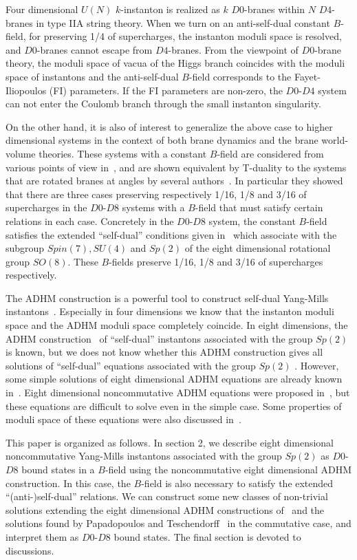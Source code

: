 \documentclass[a4paper,12pt]{article}
\begin{document}
Four dimensional $U(N)$ $k$-instanton is realized as $k$ $D0$-branes 
within $N$ $D4$-branes in type IIA string theory.
When we turn on an anti-self-dual constant $B$-field, 
for preserving 1/4 of supercharges,  
the instanton moduli space is resolved, and $D0$-branes 
cannot escape from $D4$-branes.
From the viewpoint of $D0$-brane theory, 
the moduli space of vacua of the Higgs branch coincides with the moduli space 
of instantons and the anti-self-dual $B$-field corresponds to  
the Fayet-Iliopoulos (FI) parameters.
If the FI parameters are non-zero, the $D0$-$D4$ system can not enter the 
Coulomb branch through the small instanton singularity.

On the other hand, it is also of interest to generalize the above case 
to higher dimensional systems in the context of both brane dynamics and the 
brane world-volume theories.
These systems with a constant $B$-field are considered 
from various points of view in~\cite{cimm, park, witten, fio, ohta}, 
and are shown equivalent by T-duality to the systems 
that are rotated branes at angles by several 
authors~\cite{ohtan, ohta, pt, pt2, ggpt}.
In particular they showed that there are three cases  
preserving respectively 1/16, 1/8 and 3/16 of supercharges 
in the $D0$-$D8$ systems with a $B$-field that must satisfy certain 
relations in each case. 
Concretely in the $D0$-$D8$ system, the constant $B$-field satisfies the 
extended ``self-dual'' conditions given in~\cite{cdfn, ward} 
which associate with the subgroup $Spin(7), SU(4)$ and $Sp(2)$ 
of the eight dimensional rotational group $SO(8)$.
These $B$-fields preserve 1/16, 1/8 and 3/16 of supercharges respectively.

The ADHM construction is a powerful tool to construct self-dual Yang-Mills 
instantons~\cite{adhm, cg}.
Especially in four dimensions we know that the instanton moduli space 
and the ADHM moduli space completely coincide. 
In eight dimensions, the ADHM construction~\cite{cgk} 
of ``self-dual'' instantons associated with the group $Sp(2)$ 
is known, 
but we does not know whether this ADHM construction gives all solutions 
of ``self-dual'' equations associated with the group $Sp(2)$ .
However, some simple solutions of eight dimensional ADHM equations are already 
known in~\cite{cgk, pt}.
Eight dimensional noncommutative ADHM equations were proposed in~\cite{ohta}, 
but these equations are difficult to solve even in the simple case. 
Some properties of moduli space of these equations 
were also discussed in~\cite{hio}.

This paper is organized as follows. 
In section 2, we describe eight dimensional noncommutative 
Yang-Mills instantons associated with the group $Sp(2)$ 
as $D0$-$D8$ bound states in a $B$-field
using the noncommutative eight dimensional ADHM construction. 
In this case, the $B$-field is also necessary to satisfy the extended 
``(anti-)self-dual'' relations.
We can construct some new classes of non-trivial solutions 
extending the eight dimensional ADHM constructions of~\cite{cgk} 
and the solutions found by Papadopoulos and Teschendorff~\cite{pt} 
in the commutative case, 
and interpret them as $D0$-$D8$ bound states.
The final section is devoted to discussions.
\end{document}
